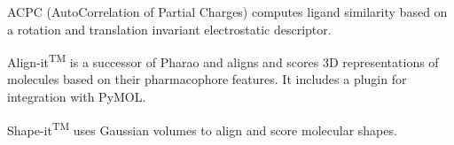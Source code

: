 ACPC (AutoCorrelation of Partial Charges) \cite{Berenger_2014} computes ligand similarity based on a rotation and translation invariant electrostatic descriptor.

Align-it\textsuperscript{TM} is a successor of Pharao \cite{Taminau_2008} and aligns and scores 3D representations of molecules based on their pharmacophore features.  It includes a plugin for integration with PyMOL.


Shape-it\textsuperscript{TM} uses Gaussian volumes to align and score molecular shapes.



